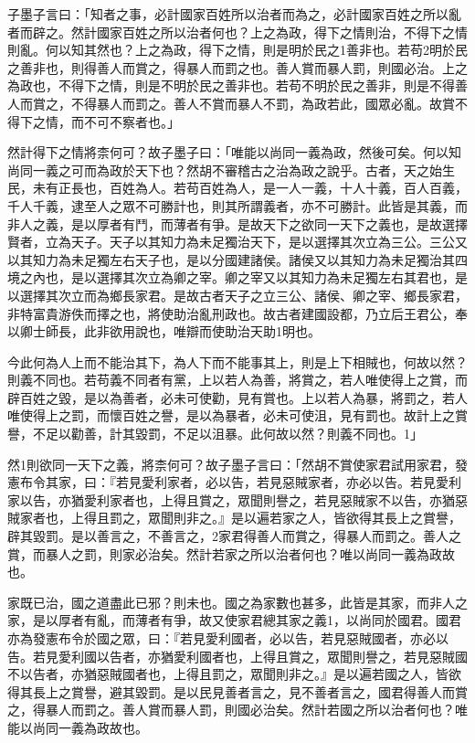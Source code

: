 
\begin{pinyinscope}
子墨子言曰：「知者之事，必計國家百姓所以治者而為之，必計國家百姓之所以亂者而辟之。然計國家百姓之所以治者何也？上之為政，得下之情則治，不得下之情則亂。何以知其然也？上之為政，得下之情，則是明於民之1善非也。若苟2明於民之善非也，則得善人而賞之，得暴人而罰之也。善人賞而暴人罰，則國必治。上之為政也，不得下之情，則是不明於民之善非也。若苟不明於民之善非，則是不得善人而賞之，不得暴人而罰之。善人不賞而暴人不罰，為政若此，國眾必亂。故賞不得下之情，而不可不察者也。」

然計得下之情將柰何可？故子墨子曰：「唯能以尚同一義為政，然後可矣。何以知尚同一義之可而為政於天下也？然胡不審稽古之治為政之說乎。古者，天之始生民，未有正長也，百姓為人。若苟百姓為人，是一人一義，十人十義，百人百義，千人千義，逮至人之眾不可勝計也，則其所謂義者，亦不可勝計。此皆是其義，而非人之義，是以厚者有鬥，而薄者有爭。是故天下之欲同一天下之義也，是故選擇賢者，立為天子。天子以其知力為未足獨治天下，是以選擇其次立為三公。三公又以其知力為未足獨左右天子也，是以分國建諸侯。諸侯又以其知力為未足獨治其四境之內也，是以選擇其次立為卿之宰。卿之宰又以其知力為未足獨左右其君也，是以選擇其次立而為鄉長家君。是故古者天子之立三公、諸侯、卿之宰、鄉長家君，非特富貴游佚而擇之也，將使助治亂刑政也。故古者建國設都，乃立后王君公，奉以卿士師長，此非欲用說也，唯辯而使助治天助1明也。

今此何為人上而不能治其下，為人下而不能事其上，則是上下相賊也，何故以然？則義不同也。若苟義不同者有黨，上以若人為善，將賞之，若人唯使得上之賞，而辟百姓之毀，是以為善者，必未可使勸，見有賞也。上以若人為暴，將罰之，若人唯使得上之罰，而懷百姓之譽，是以為暴者，必未可使沮，見有罰也。故計上之賞譽，不足以勸善，計其毀罰，不足以沮暴。此何故以然？則義不同也。1」

然1則欲同一天下之義，將柰何可？故子墨子言曰：「然胡不賞使家君試用家君，發憲布令其家，曰：『若見愛利家者，必以告，若見惡賊家者，亦必以告。若見愛利家以告，亦猶愛利家者也，上得且賞之，眾聞則譽之，若見惡賊家不以告，亦猶惡賊家者也，上得且罰之，眾聞則非之。』是以遍若家之人，皆欲得其長上之賞譽，辟其毀罰。是以善言之，不善言之，2家君得善人而賞之，得暴人而罰之。善人之賞，而暴人之罰，則家必治矣。然計若家之所以治者何也？唯以尚同一義為政故也。

家既已治，國之道盡此已邪？則未也。國之為家數也甚多，此皆是其家，而非人之家，是以厚者有亂，而薄者有爭，故又使家君總其家之義1，以尚同於國君。國君亦為發憲布令於國之眾，曰：『若見愛利國者，必以告，若見惡賊國者，亦必以告。若見愛利國以告者，亦猶愛利國者也，上得且賞之，眾聞則譽之，若見惡賊國不以告者，亦猶惡賊國者也，上得且罰之，眾聞則非之。』是以遍若國之人，皆欲得其長上之賞譽，避其毀罰。是以民見善者言之，見不善者言之，國君得善人而賞之，得暴人而罰之。善人賞而暴人罰，則國必治矣。然計若國之所以治者何也？唯能以尚同一義為政故也。


\end{pinyinscope}
